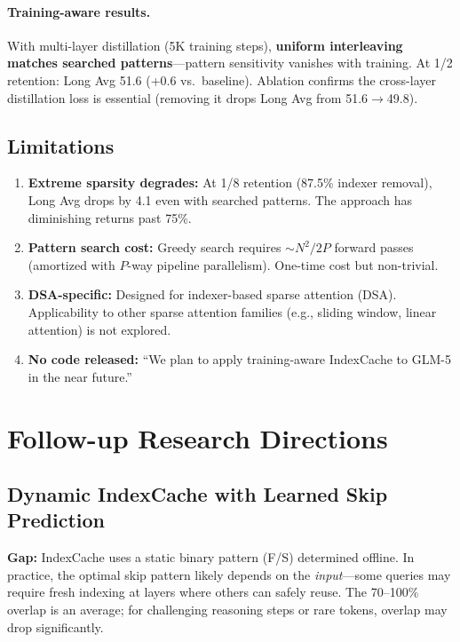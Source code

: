 \documentclass[11pt]{article}
\begin{document}
\paragraph{Training-aware results.} With multi-layer distillation (5K training steps), \textbf{uniform interleaving matches searched patterns}---pattern sensitivity vanishes with training. At 1/2 retention: Long Avg 51.6 (+0.6 vs.\ baseline). Ablation confirms the cross-layer distillation loss is essential (removing it drops Long Avg from 51.6$\to$49.8).

\subsection{Limitations}

\begin{enumerate}
    \item \textbf{Extreme sparsity degrades:} At 1/8 retention (87.5\% indexer removal), Long Avg drops by 4.1 even with searched patterns. The approach has diminishing returns past 75\%.
    \item \textbf{Pattern search cost:} Greedy search requires ${\sim}N^2/2P$ forward passes (amortized with $P$-way pipeline parallelism). One-time cost but non-trivial.
    \item \textbf{DSA-specific:} Designed for indexer-based sparse attention (DSA). Applicability to other sparse attention families (e.g., sliding window, linear attention) is not explored.
    \item \textbf{No code released:} ``We plan to apply training-aware IndexCache to GLM-5 in the near future.''
\end{enumerate}

\section{Follow-up Research Directions}

\subsection{Dynamic IndexCache with Learned Skip Prediction}

\textbf{Gap:} IndexCache uses a static binary pattern (F/S) determined offline. In practice, the optimal skip pattern likely depends on the \emph{input}---some queries may require fresh indexing at layers where others can safely reuse. The 70--100\% overlap is an average; for challenging reasoning steps or rare tokens, overlap may drop significantly.
\end{document}
